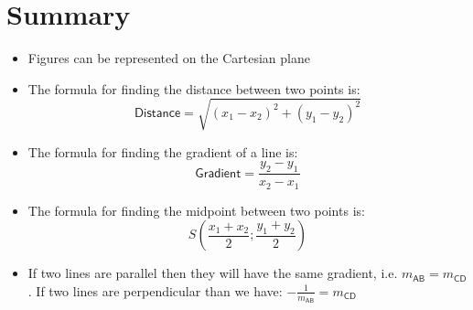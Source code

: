             \section{ Summary }
            \nopagebreak
\label{m39167*fs-id1165371842904}
\label{m39167*eip-966}\begin{itemize}[noitemsep]
            \item Figures can be represented on the Cartesian plane\item The formula for finding the distance between two points is: \label{m39167*eid9734}\nopagebreak\noindent{}
    \begin{equation}
    \mathsf{Distance}=\sqrt{{\left({x}_{1}-{x}_{2}\right)}^{2}+{\left({y}_{1}-{y}_{2}\right)}^{2}}
      \end{equation}
    \item The formula for finding the gradient of a line is: \label{m39167*edi6342}\nopagebreak\noindent{}
    \begin{equation}
    \mathsf{Gradient}=\frac{{y}_{2}-{y}_{1}}{{x}_{2}-{x}_{1}}
      \end{equation}
    \item The formula for finding the midpoint between two points is: \label{m39167*eid6743}\nopagebreak\noindent{}
    \begin{equation}
    S\left(\frac{{x}_{1}+{x}_{2}}{2};\frac{{y}_{1}+{y}_{2}}{2}\right)
      \end{equation}
\item  If two lines are parallel then they will have the same gradient, i.e. ${m}_{\mathsf{AB}}={m}_{\mathsf{CD}}$. If two lines are perpendicular than we have: $-\frac{1}{{m}_{\mathsf{AB}}}={m}_{\mathsf{CD}}$\end{itemize}
\par 
\label{m39167*secfhsst!!!underscore!!!id2370}
